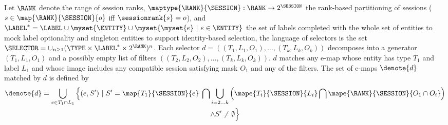 Let
${\RANK}$
denote the range of session ranks,
${\maptype{\RANK}{\SESSION}}:\RANK\rightarrow2{^\SESSION}$
the rank-based partitioning of sessions
($s\in\map{\RANK}{\SESSION}{o}$ iff $\sessionrank{s}=o$),
and
${\LABEL}^{*}={\LABEL}\cup\myset{\ENTITY}\cup\myset{\myset{e}\ |\ e\in{\ENTITY}}$
the set of labels 
completed 
with the whole set of entities to mock label optionality
and singleton entities to support identity-based selection,
the language of selectors
is the set 
$
{\SELECTOR}=\cup_{n\geq1}({\TYPE}\times{\LABEL}^*\times{2^{\RANK}})^{n}
$.
Each selector 
$
d=((T_1,L_1,O_1),\ldots,(T_k,L_k,O_k))
$
decomposes into a generator
$
(T_1,L_1,O_1)
$
and a possibly empty list of filters
$
((T_2,L_2,O_2),\ldots,(T_k,L_k,O_k))
$.
$d$ matches any e-map
whose entity has type $T_1$ and label $L_1$ and whose image includes any compatible session satisfying mask $O_1$ and any of the filters.
The set of e-maps
$\denote{d}$
matched by $d$
is defined by
%
\begin{multline*}
\denote{d}=
\bigcup\limits_{e\in{T_1\cap L_1}}
\Big \{(e,S')
\ |\ 
S'=
\map{T_1}{\SESSION}{e}
\;\bigcap
\bigcup\limits_{i=2\ldots k}
{\Big(
\mape{T_i}{\SESSION}{L_i}
\bigcap
\mape{\RANK}{\SESSION}{O_1\cap O_i}
\Big)
}
\\
\wedge
S'\neq\emptyset
\Big \}
\end{multline*}

